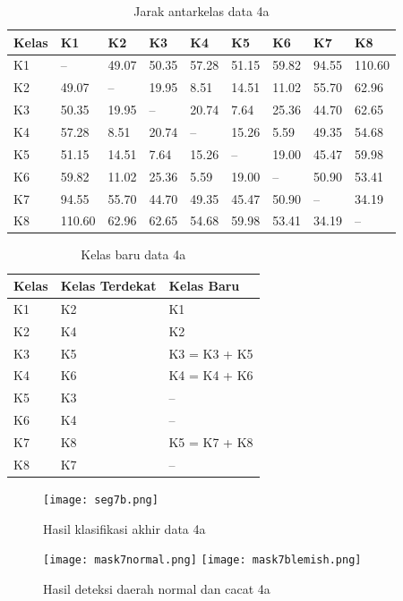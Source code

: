 \documentclass[laporan.tex]{subfiles}
\begin{document}
\begin{table}[h]
\centering
\begin{tabular}{|l|l|l|l|l|l|l|l|l|}
\hline
Kelas & K1 & K2 & K3 & K4 & K5 & K6 & K7 & K8 \\
\hline
K1 & -- & 49.07 & 50.35 & 57.28 & 51.15 & 59.82 & 94.55 & 110.60 \\
K2 & 49.07 & -- & 19.95 & 8.51 & 14.51 & 11.02 & 55.70 & 62.96 \\
K3 & 50.35 & 19.95 & -- & 20.74 & 7.64 & 25.36 & 44.70 & 62.65 \\
K4 & 57.28 & 8.51 & 20.74 & -- & 15.26 & 5.59 & 49.35 & 54.68 \\
K5 & 51.15 & 14.51 & 7.64 & 15.26 & -- & 19.00 & 45.47 & 59.98 \\
K6 & 59.82 & 11.02 & 25.36 & 5.59 & 19.00 & -- & 50.90 & 53.41 \\
K7 & 94.55 & 55.70 & 44.70 & 49.35 & 45.47 & 50.90 & -- & 34.19 \\
K8 & 110.60 & 62.96 & 62.65 & 54.68 & 59.98 & 53.41 & 34.19 & -- \\
\hline
\end{tabular}
\caption[]{Jarak antarkelas data 4a}
\label{table:distgreen}
\end{table}

\begin{table}[h]
\centering
\begin{tabular}{|l|l|l|}
\hline
Kelas & Kelas Terdekat & Kelas Baru \\
\hline
K1 & K2 & K1 \\
K2 & K4 & K2 \\
K3 & K5 & K3 = K3 + K5 \\
K4 & K6 & K4 = K4 + K6 \\
K5 & K3 & -- \\
K6 & K4 & -- \\
K7 & K8 & K5 = K7 + K8 \\
K8 & K7 & -- \\
\hline
\end{tabular}
\caption[]{Kelas baru data 4a}
\label{table:clsgreen2}
\end{table}

\begin{figure}[h]
\centering
\texttt{[image: seg7b.png]}
\caption[]{Hasil klasifikasi akhir data 4a}
\end{figure}

\begin{figure}[h]
\centering
\texttt{[image: mask7normal.png]} \qquad
\texttt{[image: mask7blemish.png]}
\caption[]{Hasil deteksi daerah normal dan cacat 4a}
\end{figure}
\end{document}
